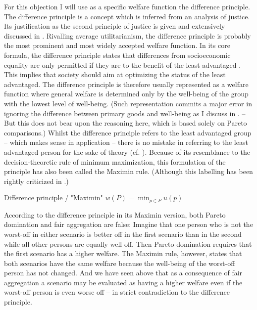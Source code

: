 For this objection I will use as a specific welfare function the difference principle. The difference principle is a concept which is inferred from an analysis of justice. Its justification as the second principle of justice is given and extensively discussed in \cite[pp.~3-183]{rawls_2005}. Rivalling average utilitarianism, the difference principle is probably the most prominent and most widely accepted welfare function. In its core formula, the difference principle states that differences from socioeconomic equality are only permitted if they are to the benefit of the least advantaged \cite[p.~302]{rawls_2005}. This implies that society should aim at optimizing the status of the least advantaged. The difference principle is therefore usually represented as a welfare function where general welfare is determined only by the well-being of the group with the lowest level of well-being. (Such representation commits a major error in ignoring the difference between primary goods and well-being as I discuss in . – But this does not bear upon the reasoning here, which is based solely on Pareto comparisons.) Whilst the difference principle refers to the least advantaged group – which makes sense in application – there is no mistake in referring to the least advantaged person for the sake of theory (cf. ). Because of its resemblance to the decision-theoretic rule of minimum maximization, this formulation of the principle has also been called the Maximin rule. (Although this labelling has been rightly criticized in .) 

\begin{Definition}{Difference principle / "Maximin"}{} 
$w(P) = \min_{p\in P} u(p)$
\end{Definition}

According to the difference principle in its Maximin version, both Pa\-re\-to domination and fair aggregation are false: Imagine that one person who is not the worst-off in either scenario is better off in the first scenario than in the second while all other persons are equally well off. Then Pareto domination requires that the first scenario has a higher welfare. The Maximin rule, however, states that both scenarios have the same welfare because the well-being of the worst-off person has not changed. And we have seen above that as a consequence of fair aggregation a scenario may be evaluated as having a higher welfare even if the worst-off person is even worse off – in strict contradiction to the difference principle. 

